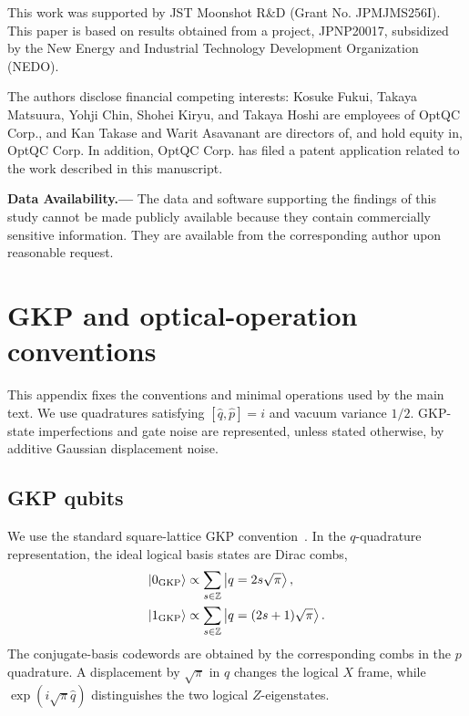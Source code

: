 \documentclass[aps,
prx,
superscriptaddress,
reprint,
longbibliography,
floatfix]{revtex4-2}
\newcommand{\GKP}{\mathrm{GKP}}
\begin{document}
\begin{acknowledgments}

This work was supported by JST Moonshot R\&D (Grant No. JPMJMS256I). This paper is based on
results obtained from a project, JPNP20017, subsidized
by the New Energy and Industrial Technology Development Organization (NEDO).

The authors disclose financial competing interests:
Kosuke Fukui, Takaya Matsuura, Yohji Chin, Shohei Kiryu, and Takaya Hoshi are employees of OptQC
Corp., and Kan Takase and Warit Asavanant are directors of, and hold equity in, OptQC Corp. In addition,
OptQC Corp. has filed a patent application related to
the work described in this manuscript.



\end{acknowledgments}


\noindent\textbf{Data Availability.---} The data and software supporting the findings of this study cannot be made publicly available because they contain commercially sensitive information. They are available from the corresponding author upon reasonable request.

\appendix
\section{GKP and optical-operation conventions}\label{sec:prelim}
This appendix fixes the conventions and minimal operations used by the main text. We use quadratures satisfying $[\hat q,\hat p]=i$ and vacuum variance $1/2$. GKP-state imperfections and gate noise are represented, unless stated otherwise, by additive Gaussian displacement noise.

\subsection{GKP qubits}
\label{app:gkp_operations}

We use the standard square-lattice GKP convention~\cite{GKP2001}. In the \(q\)-quadrature representation, the ideal logical basis states are Dirac combs,
\begin{align}
 \ket{0_{\GKP}}
 &\propto
 \sum_{s\in\mathbb{Z}}
 \ket{q=2s\sqrt{\pi}},
 \label{eq:appA_gkp_zero_q}\\
 \ket{1_{\GKP}}
 &\propto
 \sum_{s\in\mathbb{Z}}
 \ket{q=(2s+1)\sqrt{\pi}}.
 \label{eq:appA_gkp_one_q}
\end{align}
The conjugate-basis codewords are obtained by the corresponding combs in the \(p\) quadrature. A displacement by \(\sqrt{\pi}\) in \(q\) changes the logical \(X\) frame, while \(\exp(i\sqrt{\pi}\hat q)\) distinguishes the two logical \(Z\)-eigenstates.
\end{document}
